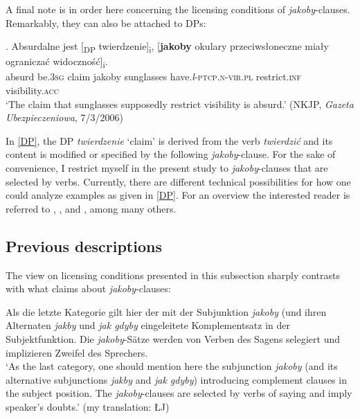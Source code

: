 \documentclass[output=paper
,modfonts
,nonflat]{langsci/langscibook}
\newcommand{\glossformat}[1]{\textsc{#1}}
\newcommand{\thirdperson}{\glossformat{3}\xspace}
\newcommand{\acc}{\glossformat{acc}\xspace}
\newcommand{\infv}{\glossformat{inf}\xspace}
\newcommand{\lptcp}{\emph{l}\glossformat{-ptcp}\xspace}
\newcommand{\nvir}{\glossformat{n-vir}\xspace}
\newcommand{\pl}{\glossformat{pl}\xspace}
\newcommand{\sg}{\glossformat{sg}\xspace}
\newcommand{\nquelle}[1]{\newline\phantom{x}\hfill(#1)}
\begin{document}
A final note is in order here concerning the licensing conditions of \emph{jakoby}-clauses. Remarkably, they can also be attached to DPs: 

\exg.		Absurdalne jest [\textsubscript{DP} twierdzenie]\textsubscript{i}, [\textbf{jakoby} {okulary przeciwsłoneczne} miały ograniczać widoczność]\textsubscript{i}. \label{DP} \\ 
		absurd be.{\thirdperson}{\sg} {} claim jakoby sunglasses have.{\lptcp}.{\nvir}.{\pl}  restrict.{\infv} visibility.{\acc} \\
		`The claim that sunglasses supposedly restrict visibility is absurd.' \nquelle{NKJP, \emph{Gazeta Ubezpieczeniowa}, 7/3/2006}  

In \ref{DP}, the DP \emph{twierdzenie} `claim' is derived from the verb \emph{twierdzić} and its content is modified or specified by the following \emph{jakoby}-clause. For the sake of convenience, I restrict myself in the present study to \emph{jakoby}-clauses that are selected by verbs. Currently, there are different technical possibilities for how one could analyze examples as given in \ref{DP}. For an overview the interested reader is referred to \textcite{Moulton2009}, \textcite{Haegeman-Urogdi2010}, and \textcite{deCuba2017}, among many others.   

\subsection{Previous descriptions}

The view on licensing conditions presented in this subsection sharply contrasts with what \textcite[110-115, 156-157]{Taborek2008} claims about \emph{jakoby}-clauses:

\begin{displayquote}
Als die letzte Kategorie gilt hier der mit der Subjunktion \emph{jakoby} (und ihren Alternaten \emph{jakby} und \emph{jak gdyby} eingeleitete Komplementsatz in der Subjekt\-funktion. Die \emph{jakoby}-Sätze werden von Verben des Sagens selegiert und implizieren Zweifel des Sprechers. \\ `As the last category, one should mention here the subjunction \emph{jakoby} (and its alternative subjunctions \emph{jakby} and \emph{jak gdyby}) introducing complement clauses in the subject position. The \emph{jakoby}-clauses are selected by verbs of saying and imply speaker's doubts.' (my translation: ŁJ)   \newline \textcite[100-101]{Taborek2008}
\end{displayquote}
\end{document}
